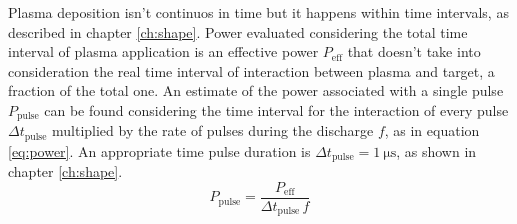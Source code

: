 Plasma deposition isn't continuos in time but it happens within time intervals, as described in chapter \ref{ch:shape}.
Power evaluated considering the total time interval of plasma application is an effective power $P_{\text{eff}}$ that doesn't take into consideration the real time interval of interaction between plasma and target, a fraction of the total one. An estimate of the power associated with a single pulse $P_{\text{pulse}}$ can be found considering the time interval for the interaction of every pulse $\Delta t_{\text{pulse}}$ multiplied by the rate of pulses during the discharge $f$, as in equation \ref{eq:power}. An appropriate time pulse duration is $\Delta t_{\text{pulse}} = \SI{1}{\micro\second}$, as shown in chapter \ref{ch:shape}.
\begin{equation}
 P_{\text{pulse}} = \frac{P_{\text{eff}}}{\Delta t_{\text{pulse}} \, f}
 \label{eq:power}
\end{equation}


